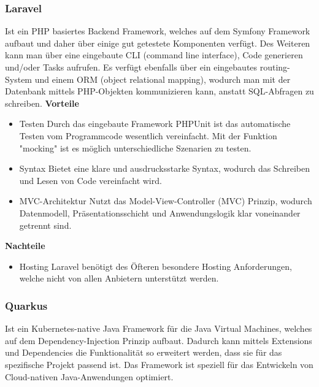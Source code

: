 \subsubsection{Laravel}
Ist ein PHP basiertes Backend Framework, welches auf dem Symfony Framework aufbaut und daher über einige gut getestete Komponenten verfügt. Des Weiteren kann man über eine eingebaute CLI (command line interface), Code generieren und/oder Tasks aufrufen. Es verfügt ebenfalls über ein eingebautes routing-System und einem ORM (object relational mapping), wodurch man mit der Datenbank mittels PHP-Objekten kommunizieren kann, anstatt SQL-Abfragen zu schreiben.
\newline
\textbf{Vorteile}
\begin{itemize}
    \item Testen
        \newline
        Durch das eingebaute Framework PHPUnit ist das automatische Testen vom Programmcode wesentlich vereinfacht. Mit der Funktion "mocking" ist es möglich unterschiedliche Szenarien zu testen.
    \item Syntax
        \newline
        Bietet eine klare und ausdrucksstarke Syntax, wodurch das Schreiben und Lesen von Code vereinfacht wird.
    \item MVC-Architektur
        \newline
        Nutzt das Model-View-Controller (MVC) Prinzip, wodurch Datenmodell, Präsentationsschicht und Anwendungslogik klar voneinander getrennt sind.
\end{itemize}

\textbf{Nachteile}
\begin{itemize}
    \item Hosting
        \newline
        Laravel benötigt des Öfteren besondere Hosting Anforderungen, welche nicht von allen Anbietern unterstützt werden.
\end{itemize}
\cite{backend_laravel}

\subsubsection{Quarkus}
Ist ein Kubernetes-native Java Framework für die Java Virtual Machines, welches auf dem Dependency-Injection Prinzip aufbaut. Dadurch kann mittels Extensions und Dependencies die Funktionalität so erweitert werden, dass sie für das spezifische Projekt passend ist. Das Framework ist speziell für das Entwickeln von Cloud-nativen Java-Anwendungen optimiert. 

